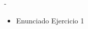 \documentclass[]{article}
\begin{document}
\begin{center}
    \textbf{\sigla \text{ } \curso} - \textbf{\tipo} \\
    \ayudantes    
\end{center}

\bigskip

\bigskip

\begin{itemize}
    \item[1.] Enunciado Ejercicio 1 %
\end{itemize}

\newpage 
\end{document}
